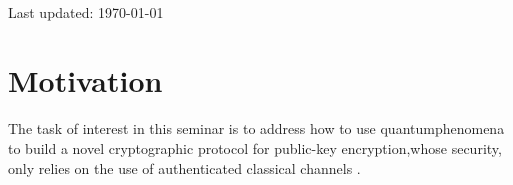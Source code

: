 \documentclass[12pt]{article}
\begin{document}
\begin{titlepage}
\begin{minipage}{0.75\textwidth}
    \end{minipage}\\[2cm]
    \vspace{-1cm}    
    
    
    {\large{Last updated: \today}}\\[2cm] %
    
    \vfill %

    \end{titlepage}

    \clearpage

    
    \section{Motivation}
    \label{sec:motivation}

    The task of interest in this seminar is to address how to use quantum\break phenomena to build a novel cryptographic protocol for public-key encryption,\break whose security, only relies on the use of authenticated classical channels \cite{malavolta-walter:robust-quantum-public-key-encryption-with-applications-to-quantum-key-distribution:2024:03-2024}.
    
\end{document}

